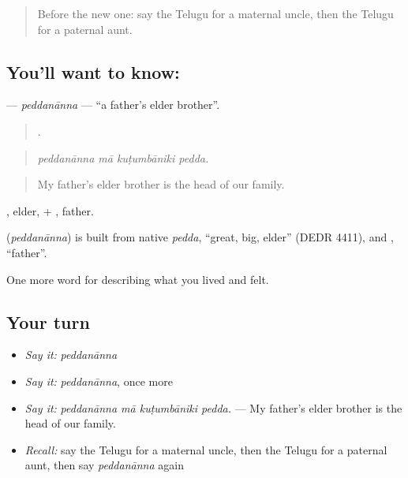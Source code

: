 \label{lesson:TE-C529-peddananna}



\begin{quote}
Before the new one: say the Telugu for a maternal uncle, then the Telugu for a paternal aunt.
\end{quote}

\subsection*{You'll want to know: }
\textbf{} — \emph{peddanānna} — \textquotedblleft{}a father's elder brother\textquotedblright{}.

\begin{quote}
   .
\end{quote}

\begin{quote}
\emph{peddanānna mā kuṭumbāniki pedda.}
\end{quote}

\begin{quote}
My father's elder brother is the head of our family.
\end{quote}

, elder, + , father.

\begin{cousinweb}
\textbf{} (\emph{peddanānna}) is built from native \emph{pedda}, \textquotedblleft{}great, big, elder\textquotedblright{} (DEDR 4411), and , \textquotedblleft{}father\textquotedblright{}.
\end{cousinweb}

\begin{grammarlens}[title={What you've built}]
One more word for describing what you lived and felt.
\end{grammarlens}

\subsection*{Your turn}
\begin{itemize}
\raggedright
  \item \emph{Say it:} \emph{peddanānna}
  \item \emph{Say it:} \emph{peddanānna}, once more
  \item \emph{Say it:} \emph{peddanānna mā kuṭumbāniki pedda.} — My father's elder brother is the head of our family.
  \item \emph{Recall:} say the Telugu for a maternal uncle, then the Telugu for a paternal aunt, then say \emph{peddanānna} again
\end{itemize}

